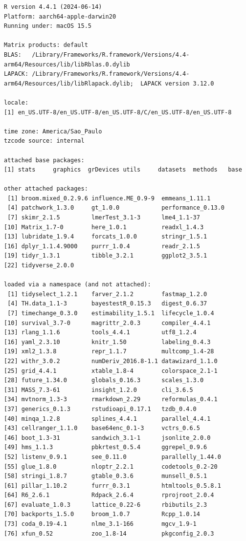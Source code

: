 \documentclass[
  letterpaper,
  DIV=11,
  numbers=noendperiod]{scrartcl}
\begin{document}
\begin{verbatim}
R version 4.4.1 (2024-06-14)
Platform: aarch64-apple-darwin20
Running under: macOS 15.5

Matrix products: default
BLAS:   /Library/Frameworks/R.framework/Versions/4.4-arm64/Resources/lib/libRblas.0.dylib 
LAPACK: /Library/Frameworks/R.framework/Versions/4.4-arm64/Resources/lib/libRlapack.dylib;  LAPACK version 3.12.0

locale:
[1] en_US.UTF-8/en_US.UTF-8/en_US.UTF-8/C/en_US.UTF-8/en_US.UTF-8

time zone: America/Sao_Paulo
tzcode source: internal

attached base packages:
[1] stats     graphics  grDevices utils     datasets  methods   base     

other attached packages:
 [1] broom.mixed_0.2.9.6 influence.ME_0.9-9  emmeans_1.11.1     
 [4] patchwork_1.3.0     gt_1.0.0            performance_0.13.0 
 [7] skimr_2.1.5         lmerTest_3.1-3      lme4_1.1-37        
[10] Matrix_1.7-0        here_1.0.1          readxl_1.4.3       
[13] lubridate_1.9.4     forcats_1.0.0       stringr_1.5.1      
[16] dplyr_1.1.4.9000    purrr_1.0.4         readr_2.1.5        
[19] tidyr_1.3.1         tibble_3.2.1        ggplot2_3.5.1      
[22] tidyverse_2.0.0    

loaded via a namespace (and not attached):
 [1] tidyselect_1.2.1    farver_2.1.2        fastmap_1.2.0      
 [4] TH.data_1.1-3       bayestestR_0.15.3   digest_0.6.37      
 [7] timechange_0.3.0    estimability_1.5.1  lifecycle_1.0.4    
[10] survival_3.7-0      magrittr_2.0.3      compiler_4.4.1     
[13] rlang_1.1.6         tools_4.4.1         utf8_1.2.4         
[16] yaml_2.3.10         knitr_1.50          labeling_0.4.3     
[19] xml2_1.3.8          repr_1.1.7          multcomp_1.4-28    
[22] withr_3.0.2         numDeriv_2016.8-1.1 datawizard_1.1.0   
[25] grid_4.4.1          xtable_1.8-4        colorspace_2.1-1   
[28] future_1.34.0       globals_0.16.3      scales_1.3.0       
[31] MASS_7.3-61         insight_1.2.0       cli_3.6.5          
[34] mvtnorm_1.3-3       rmarkdown_2.29      reformulas_0.4.1   
[37] generics_0.1.3      rstudioapi_0.17.1   tzdb_0.4.0         
[40] minqa_1.2.8         splines_4.4.1       parallel_4.4.1     
[43] cellranger_1.1.0    base64enc_0.1-3     vctrs_0.6.5        
[46] boot_1.3-31         sandwich_3.1-1      jsonlite_2.0.0     
[49] hms_1.1.3           pbkrtest_0.5.4      ggrepel_0.9.6      
[52] listenv_0.9.1       see_0.11.0          parallelly_1.44.0  
[55] glue_1.8.0          nloptr_2.2.1        codetools_0.2-20   
[58] stringi_1.8.7       gtable_0.3.6        munsell_0.5.1      
[61] pillar_1.10.2       furrr_0.3.1         htmltools_0.5.8.1  
[64] R6_2.6.1            Rdpack_2.6.4        rprojroot_2.0.4    
[67] evaluate_1.0.3      lattice_0.22-6      rbibutils_2.3      
[70] backports_1.5.0     broom_1.0.7         Rcpp_1.0.14        
[73] coda_0.19-4.1       nlme_3.1-166        mgcv_1.9-1         
[76] xfun_0.52           zoo_1.8-14          pkgconfig_2.0.3    
\end{verbatim}
\end{document}
